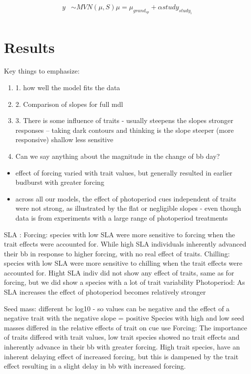 \documentclass{article}\usepackage[]{graphicx}\usepackage[]{color}
\begin{document}
\begin{align*}
y & \sim MVN(\mu, S)
\mu = \mu_{grand_{sp}} + \alpha study_{study_i} \\
\end{align*}

\section{Results}

Key things to emphasize:
\begin{enumerate}
\item 1. how well the model fits the data
\item 2. Comparison of slopes for full mdl 
\item 3. There is some influence of traits - usually steepens the slopes stronger responses -- taking dark contours and thinking is the slope steeper (more responsive) shallow less sensitive 
\item Can we say anything about the magnitude in the change of bb day?
\end{enumerate}

\begin{itemize}
\item effect of forcing varied with trait values, but generally resulted in earlier budburst with greater forcing
\item across all our models, the effect of photoperiod cues independent of traits were not strong, as illustrated by the flat or negligible slopes - even though data is from experiments with a large range of photoperiod treatments
\end{itemize}

SLA :
Forcing: species with low SLA were more sensitive to forcing when the trait effects were accounted for. While high SLA individuals inherently advanced their bb in response to higher forcing, with no real effect of traits. %
Chilling: species with low SLA were more sensitive to chilling when the trait effects were accounted for. Hight SLA indiv did not show any effect of traits, same as for forcing, but we did show a species with a lot of trait variability
Photoperiod: As SLA increases the effect of photoperiod becomes relatively stronger 

Seed mass: different bc log10 - so values can be negative and the effect of a negative trait with the negative slope = positive
Species with high and low seed masses differed in the relative effects of trait on cue use 
Forcing: The importance of traits differed with trait values, low trait species showed no trait effects and inherently advance in their bb with greater forcing. High trait species, have an inherent delaying effect of increased forcing, but this is dampened by the trait effect resulting in a slight delay in bb with increased forcing.
\end{document}
